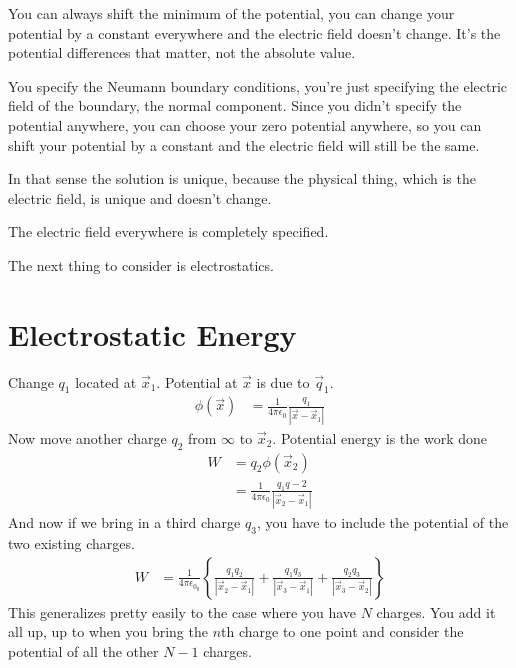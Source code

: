 You can always shift the minimum of the potential,
you can change your potential by a constant everywhere and the electric field
doesn't change.
It's the potential differences that matter,
not the absolute value.

You specify the Neumann boundary conditions,
you're just specifying the electric field of the boundary,
the normal component.
Since you didn't specify the potential anywhere,
you can choose your zero potential anywhere,
so you can shift your potential by a constant and the electric field will still
be the same.

In that sense the solution is unique,
because the physical thing,
which is the electric field,
is unique and doesn't change.

The electric field everywhere is completely specified.

The next thing to consider is electrostatics.

\section{Electrostatic Energy}
Change $q_1$ located at $\vec{x}_1$.
Potential at $\vec{x}$ is due to $\vec{q}_1$.
\begin{align}
    \phi\left(\vec{x}\right)
    &=
    \frac{1}{4\pi\epsilon_0}
    \frac{q_1}{\left|\vec{x} - \vec{x}_1\right|}
\end{align}
Now move another charge $q_2$ from $\infty$
to $\vec{x}_2$.
Potential energy is the work done
\begin{align}
    W &=
    q_2 \phi\left( \vec{x}_2 \right)\\
    &=
    \frac{1}{4\pi\epsilon_0}
    \frac{q_1 q-2}{\left|\vec{x}_2 - \vec{x}_1\right|}
\end{align}
And now if we bring in a third charge $q_3$,
you have to include the potential of the two existing charges.
\begin{align}
    W &=
    \frac{1}{4\pi\epsilon_0_0}
    \left\{ 
    \frac{q_1 q_2}{\left| \vec{x}_2 - \vec{x}_1 \right|}
    + \frac{q_1 q_3}{\left| \vec{x}_3 - \vec{x}_1 \right|}
    + \frac{q_2 q_3}{\left| \vec{x}_3 - \vec{x}_2 \right|}
    \right\}
\end{align}
This generalizes pretty easily to the case where you have $N$ charges.
You add it all up,
up to when you bring the $n$th charge to one point and consider the potential of
all the other $N-1$ charges.

